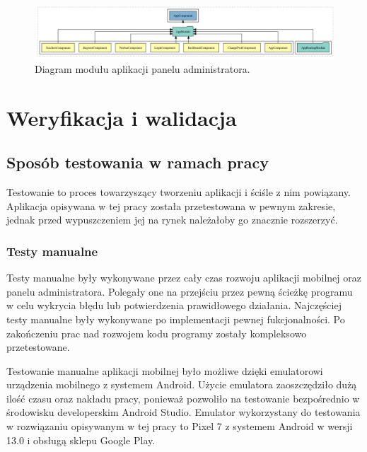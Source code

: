 \documentclass[a4paper,twoside,12pt]{book}
\begin{document}
\begin{figure}[]
\centering
\includegraphics[width=\textwidth]{angular}
\caption{Diagram modułu aplikacji panelu administratora.}
\label{fig:angular}
\end{figure}

\chapter{Weryfikacja i walidacja}
\label{ch:06}

\section{Sposób testowania w ramach pracy}

Testowanie to proces towarzyszący tworzeniu aplikacji i ściśle z nim powiązany. Aplikacja opisywana w tej pracy została przetestowana w pewnym zakresie, jednak przed wypuszczeniem jej na rynek należałoby go znacznie rozszerzyć.

\subsection{Testy manualne}

Testy manualne były wykonywane przez cały czas rozwoju aplikacji mobilnej oraz panelu administratora. Polegały one na przejściu przez pewną ścieżkę programu w celu wykrycia błędu lub potwierdzenia prawidłowego działania. Najczęściej testy manualne były wykonywane po implementacji pewnej fukcjonalności. Po zakończeniu prac nad rozwojem kodu programy zostały kompleksowo przetestowane. 

Testowanie manualne aplikacji mobilnej było możliwe dzięki emulatorowi urządzenia mobilnego z systemem Android. Użycie emulatora zaoszczędziło dużą ilość czasu oraz nakładu pracy, ponieważ pozwoliło na testowanie bezpośrednio w środowisku developerskim Android Studio. Emulator wykorzystany do testowania w rozwiązaniu opisywanym w tej pracy to Pixel 7 z systemem Android w wersji 13.0 i obsługą sklepu Google Play.
\end{document}
